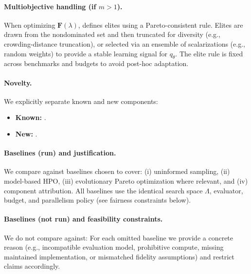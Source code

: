 \paragraph{Multiobjective handling (if \(m>1\)).}
When optimizing \(\mathbf{F}(\lambda)\), \ProposedMethodName{} defines elites using a Pareto-consistent rule.
Elites are drawn from the nondominated set and then truncated for diversity (e.g., crowding-distance truncation),
or selected via an ensemble of scalarizations (e.g., random weights) to provide a stable learning signal for \(q_{\theta}\).
The elite rule is fixed across benchmarks and budgets to avoid post-hoc adaptation.

\paragraph{Novelty.}
We explicitly separate known and new components:
\begin{itemize}
    \item \textbf{Known:} \KnownParts{}.
    \item \textbf{New:} \NoveltyDetails{}.
\end{itemize}

\paragraph{Baselines (run) and justification.}
We compare against baselines chosen to cover:
(i) uninformed sampling, (ii) model-based HPO, (iii) evolutionary Pareto optimization where relevant, and (iv) component attribution.
\BaselinesRun{}
All baselines use the identical search space \(\Lambda\), evaluator, budget, and parallelism policy (see fairness constraints below).

\paragraph{Baselines (not run) and feasibility constraints.}
We do not compare against:
\BaselinesNotRunWhy{}
For each omitted baseline we provide a concrete reason (e.g., incompatible evaluation model, prohibitive compute,
missing maintained implementation, or mismatched fidelity assumptions) and restrict claims accordingly.

